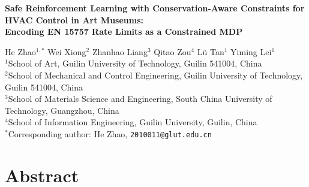 \documentclass[11pt,a4paper]{article}
\begin{document}
\linenumbers   %

\begin{center}
\Large\bfseries
Safe Reinforcement Learning with Conservation-Aware Constraints
for HVAC Control in Art Museums:\\[3pt]
Encoding EN 15757 Rate Limits as a Constrained MDP
\end{center}

\vspace{6pt}

\begin{center}
\normalsize
He Zhao$^{1,*}$ \quad
Wei Xiong$^{2}$ \quad
Zhanhao Liang$^{3}$ \quad
Qitao Zou$^{4}$ \quad
L\"u Tan$^{1}$ \quad
Yiming Lei$^{1}$\\[4pt]
\small
$^{1}$School of Art, Guilin University of Technology, Guilin 541004, China\\
$^{2}$School of Mechanical and Control Engineering, Guilin University of Technology, Guilin 541004, China\\
$^{3}$School of Materials Science and Engineering, South China University of Technology, Guangzhou, China\\
$^{4}$School of Information Engineering, Guilin University, Guilin, China\\[2pt]
$^{*}$Corresponding author: He Zhao, \texttt{2010011@glut.edu.cn}
\end{center}

\section*{Abstract}
\end{document}
